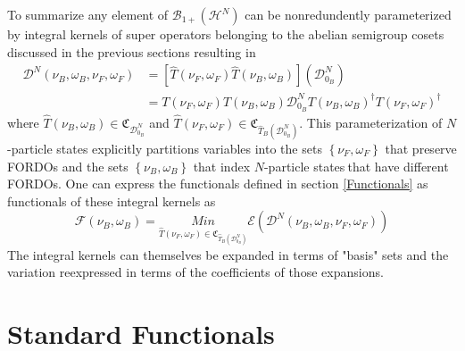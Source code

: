 \documentclass[aps,preprint]{revtex4}%
\begin{document}
To summarize any element of $\mathcal{B}_{1+}\left(  \mathcal{H}^{N}\right)  $
can be nonredundently parameterized by integral kernels of super operators
belonging to the abelian semigroup cosets discussed in the previous sections
resulting in
\begin{align}
\mathcal{D}^{N}\left(  \nu_{B},\omega_{B},\nu_{F},\omega_{F}\right)   &
=\left[  \hat{T}\left(  \nu_{F},\omega_{F}\right)  \hat{T}\left(  \nu
_{B},\omega_{B}\right)  \right]  \left(  \mathcal{D}_{0_{B}}^{N}\right)
\nonumber\\
&  =T\left(  \nu_{F},\omega_{F}\right)  T\left(  \nu_{B},\omega_{B}\right)
\mathcal{D}_{0_{B}}^{N}T\left(  \nu_{B},\omega_{B}\right)  ^{\dagger}T\left(
\nu_{F},\omega_{F}\right)  ^{\dagger}%
\end{align}
where $\hat{T}\left(  \nu_{B},\omega_{B}\right)  \in\mathfrak{C}%
_{\mathcal{D}_{0_{B}}^{N}}$ and $\hat{T}\left(  \nu_{F},\omega_{F}\right)
\in\mathfrak{C}_{\hat{T}_{B}\left(  \mathcal{D}_{0_{B}}^{N}\right)  }$. This
parameterization of $N$-particle states explicitly partitions variables into
the sets $\left\{  \nu_{F},\omega_{F}\right\}  $ that preserve FORDOs and the
sets $\left\{  \nu_{B},\omega_{B}\right\}  $ that index $N$-particle
states$\ $that have different FORDOs. One can express the functionals defined
in section \ref{Functionals} as functionals of these integral kernels as
\begin{equation}
\mathcal{F}\left(  \nu_{B},\omega_{B}\right)  =\underset{\hat{T}\left(
\nu_{F},\omega_{F}\right)  \in\mathfrak{C}_{\hat{T}_{B}\left(  \mathcal{D}%
_{0_{B}}^{N}\right)  }}{Min}\mathcal{E}\left(  \mathcal{D}^{N}\left(  \nu
_{B},\omega_{B},\nu_{F},\omega_{F}\right)  \right)
\end{equation}
The integral kernels can themselves be expanded in terms of "basis" sets and
the variation reexpressed in terms of the coefficients of those expansions.

\section{Standard Functionals\label{Standard}}
\end{document}
